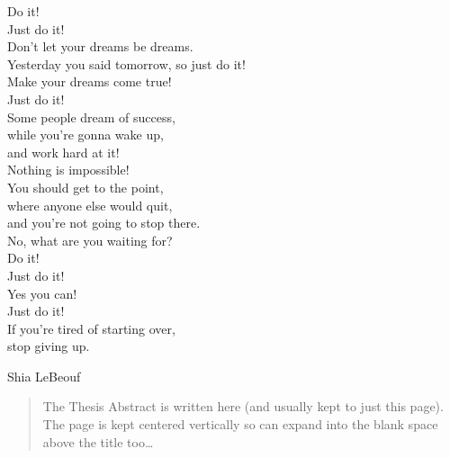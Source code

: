 \documentclass[
11pt, %
english, %
doublespacing, %
headsepline, %
]{MastersDoctoralThesis} %
\begin{document}
{\itshape \begin{center} 
Do it! \\Just do it!
\linebreak \\
Don't let your dreams be dreams.\\Yesterday you said tomorrow, so just do it!\\Make your dreams come true!\\Just do it!
\linebreak \\
Some people dream of success,\\while you're gonna wake up,\\ and work hard at it!\\Nothing is impossible!
\linebreak \\ 
You should get to the point,\\where anyone else would quit,\\and you're not going to stop there.\\No, what are you waiting for?
\linebreak \\
Do it!\\Just do it!\\Yes you can!\\Just do it!
\linebreak \\
If you're tired of starting over,\\stop giving up.
\end{center}}\bigbreak

\hfill Shia LeBeouf %




\begin{abstract}
\addchaptertocentry{\abstractname} %
The Thesis Abstract is written here (and usually kept to just this page). The page is kept centered vertically so can expand into the blank space above the title too\ldots
\end{abstract}
\end{document}
